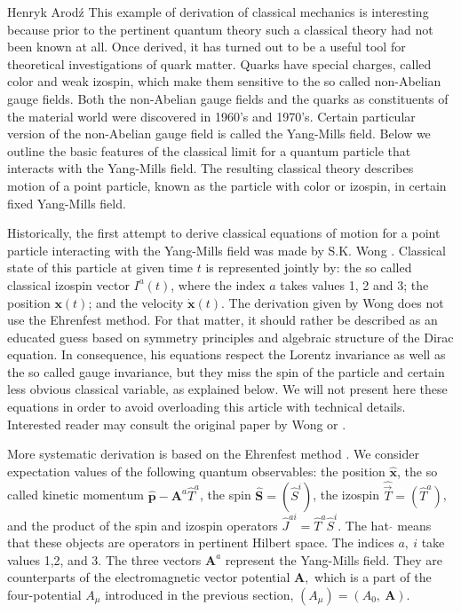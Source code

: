 \begin{artengenv}{Henryk Arod\'z}
This example of derivation of classical mechanics is interesting because prior to the pertinent quantum theory such a classical theory had not been known at all. Once derived, it has turned out to be a useful tool for theoretical investigations of quark matter. Quarks have special charges, called color and weak izospin, which make them sensitive to the so called non-Abelian gauge fields. Both the non-Abelian gauge fields and the quarks as constituents of the material world were discovered in 1960's and 1970's. Certain particular
version of the non-Abelian gauge field is called the Yang-Mills field. Below we outline the basic features of the classical limit for a quantum particle that interacts with the Yang-Mills field. The resulting classical theory describes motion of a point particle, known as the particle with color or izospin, in certain fixed Yang-Mills field.

Historically, the first attempt to derive classical equations of motion for a point particle interacting with the Yang-Mills field was made by S.K. Wong \parencite*{wong}. 
 Classical state of this particle at given time $t$ is represented jointly by: the so called classical izospin vector $I^a(t)$, where the index $a$ takes values 1, 2 and 3; the position $\mathbf{x}(t)$; and the velocity $\dot{\mathbf{x}}(t)$. The derivation given by Wong does not use the Ehrenfest method. For that matter, it should rather be described as an educated guess based on symmetry principles and algebraic structure of the Dirac equation. In consequence, his equations respect the Lorentz invariance as well as the so called gauge invariance, but they miss the spin of the particle and certain less obvious classical variable, as explained below. We will not present here these equations in order to avoid overloading this article with technical details. Interested reader may consult the original paper by Wong or \parencite{aro2}. 


More systematic derivation is based on the Ehrenfest method \parencite{aro2}. We consider expectation values of the following quantum observables: the position $\hat{\mathbf{x}}$, the so called kinetic momentum $ \hat{\mathbf{p}} - \mathbf{A}^a \hat{T}^a$, the spin $\hat{\mathbf{S}}= (\hat{S}^i)$, the izospin $\hat{\vec{T}}= (\hat{T}^a)$, and the product of the spin and izospin operators $\hat{J}^{ai} = \hat{T}^a \hat{S}^i$. The hat $\hat{}$ means that these objects are operators in pertinent Hilbert space. The indices $a, \:i $ take values 1,2, and 3. The three vectors $\mathbf{A}^a$ represent the Yang-Mills field. They are counterparts of the electromagnetic vector potential $\mathbf{A},$ which is a part of the four-potential $A_{\mu}$ introduced in the previous section, $(A_{\mu}) = ( A_0, \:\mathbf{A})$. 




\end{artengenv}
